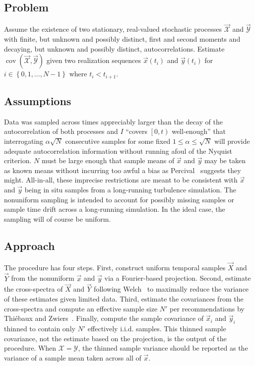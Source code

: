 \documentclass[letterpaper,11pt,nointlimits,reqno]{amsart}
\DeclareMathOperator{\cov}{cov}
\begin{document}
\subsection*{Problem}

Assume the existence of two stationary, real-valued stochastic processes
$\vec{\mathscr{X}}$ and $\vec{\mathscr{Y}}$ with finite, but unknown and
possibly distinct, first and second moments and decaying, but unknown and
possibly distinct, autocorrelations.  Estimate
$\cov\left(\vec{\mathscr{X}},\vec{\mathscr{Y}}\right)$ given two realization
sequences $\vec{x}\left(t_i\right)$ and $\vec{y}\left(t_i\right)$ for
$i\in\left\{0,1,\dots,N-1\right\}$ where $t_i < t_{i+1}$.

\subsection*{Assumptions}

Data was sampled across times appreciably larger than the decay of the
autocorrelation of both processes and $I$ ``covers $\left[0,t\right)$
well-enough'' that interrogating $\alpha \sqrt{N}$ consecutive samples for some
fixed $1\le\alpha\le\sqrt{N}$ will provide adequate autocorrelation information
without running afoul of the Nyquist criterion.  $N$ must be large enough that
sample means of $\vec{x}$ and $\vec{y}$ may be taken as known means without
incurring too awful a bias as Percival~\cite{Percival1993Three} suggests they
might.  All-in-all, these imprecise restrictions are meant to be consistent
with $\vec{x}$ and $\vec{y}$ being in situ samples from a long-running
turbulence simulation.  The nonuniform sampling is intended to account for
possibly missing samples or sample time drift across a long-running simulation.
In the ideal case, the sampling will of course be uniform.

\subsection*{Approach}

The procedure has four steps.  First, construct uniform temporal samples
$\vec{X}$ and $\vec{Y}$ from the nonuniform $\vec{x}$ and $\vec{y}$ via a
Fourier-based projection.  Second, estimate the cross-spectra of $\vec{X}$ and
$\vec{Y}$ following Welch~\cite{Welch1967Use} to maximally reduce the variance
of these estimates given limited data.  Third, estimate the covariances from
the cross-spectra and compute an effective sample size $N'$ per recommendations
by Thi\'{e}baux and Zwiers~\cite{Thiebaux1984Interpretation}.  Finally, compute
the sample covariance of $\vec{x}_i$ and $\vec{y}_i$ thinned to contain only
$N'$ effectively i.i.d. samples.  This thinned sample covariance, not the
estimate based on the projection, is the output of the procedure.  When
$\mathscr{X}=\mathscr{Y}$, the thinned sample variance should be reported as
the variance of a sample mean taken across all of $\vec{x}$.
\end{document}
